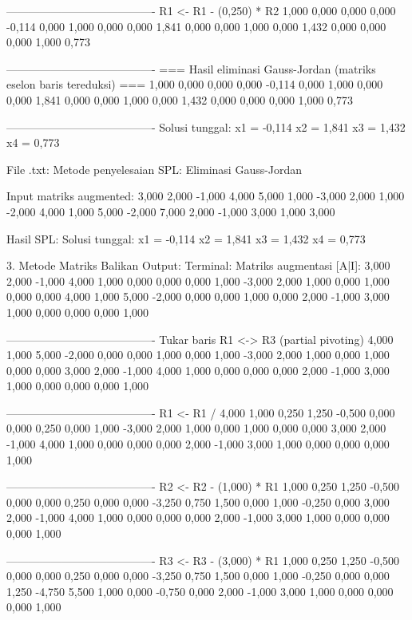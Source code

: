 \documentclass[12pt]{article}
\begin{document}
\begin{enumerate}
\begin{keluaran}
----------------------------------------
R1 <- R1 - (0,250) * R2
1,000   0,000   0,000   0,000   -0,114
0,000   1,000   0,000   0,000   1,841
0,000   0,000   1,000   0,000   1,432
0,000   0,000   0,000   1,000   0,773

----------------------------------------
=== Hasil eliminasi Gauss-Jordan (matriks eselon baris tereduksi) ===
1,000   0,000   0,000   0,000   -0,114
0,000   1,000   0,000   0,000   1,841
0,000   0,000   1,000   0,000   1,432
0,000   0,000   0,000   1,000   0,773

----------------------------------------
Solusi tunggal:
x1 = -0,114
x2 = 1,841
x3 = 1,432
x4 = 0,773

File .txt:
Metode penyelesaian SPL: Eliminasi Gauss-Jordan

Input matriks augmented:
3,000	2,000	-1,000	4,000	5,000
1,000	-3,000	2,000	1,000	-2,000
4,000	1,000	5,000	-2,000	7,000
2,000	-1,000	3,000	1,000	3,000

Hasil SPL:
Solusi tunggal:
x1 = -0,114
x2 = 1,841
x3 = 1,432
x4 = 0,773

3. Metode Matriks Balikan
Output:
Terminal:
Matriks augmentasi [A|I]:
3,000   2,000   -1,000  4,000   1,000   0,000   0,000   0,000
1,000   -3,000  2,000   1,000   0,000   1,000   0,000   0,000
4,000   1,000   5,000   -2,000  0,000   0,000   1,000   0,000
2,000   -1,000  3,000   1,000   0,000   0,000   0,000   1,000

----------------------------------------
Tukar baris R1 <-> R3 (partial pivoting)
4,000   1,000   5,000   -2,000  0,000   0,000   1,000   0,000
1,000   -3,000  2,000   1,000   0,000   1,000   0,000   0,000
3,000   2,000   -1,000  4,000   1,000   0,000   0,000   0,000
2,000   -1,000  3,000   1,000   0,000   0,000   0,000   1,000

----------------------------------------
R1 <- R1 / 4,000
1,000   0,250   1,250   -0,500  0,000   0,000   0,250   0,000
1,000   -3,000  2,000   1,000   0,000   1,000   0,000   0,000
3,000   2,000   -1,000  4,000   1,000   0,000   0,000   0,000
2,000   -1,000  3,000   1,000   0,000   0,000   0,000   1,000

----------------------------------------
R2 <- R2 - (1,000) * R1
1,000   0,250   1,250   -0,500  0,000   0,000   0,250   0,000
0,000   -3,250  0,750   1,500   0,000   1,000   -0,250  0,000
3,000   2,000   -1,000  4,000   1,000   0,000   0,000   0,000
2,000   -1,000  3,000   1,000   0,000   0,000   0,000   1,000

----------------------------------------
R3 <- R3 - (3,000) * R1
1,000   0,250   1,250   -0,500  0,000   0,000   0,250   0,000
0,000   -3,250  0,750   1,500   0,000   1,000   -0,250  0,000
0,000   1,250   -4,750  5,500   1,000   0,000   -0,750  0,000
2,000   -1,000  3,000   1,000   0,000   0,000   0,000   1,000


\end{keluaran}
\end{enumerate}
\end{document}
